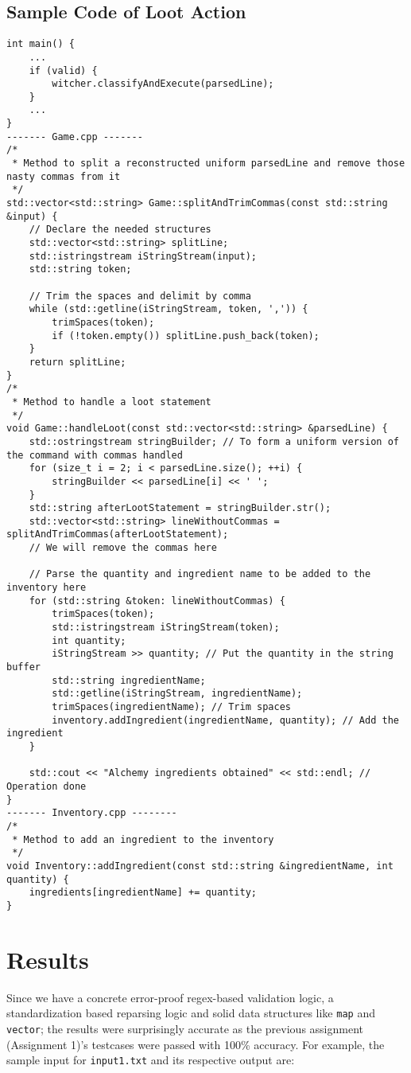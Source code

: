 \documentclass[a4paper,12pt]{article}
\begin{document}
\subsection{Sample Code of Loot Action}
\begin{lstlisting}[style=CStyle]
int main() {
    ...
    if (valid) {
        witcher.classifyAndExecute(parsedLine);
    }
    ...
}
------- Game.cpp -------
/*
 * Method to split a reconstructed uniform parsedLine and remove those nasty commas from it
 */
std::vector<std::string> Game::splitAndTrimCommas(const std::string &input) {
    // Declare the needed structures
    std::vector<std::string> splitLine;
    std::istringstream iStringStream(input);
    std::string token;

    // Trim the spaces and delimit by comma
    while (std::getline(iStringStream, token, ',')) {
        trimSpaces(token);
        if (!token.empty()) splitLine.push_back(token);
    }
    return splitLine;
}
/*
 * Method to handle a loot statement
 */
void Game::handleLoot(const std::vector<std::string> &parsedLine) {
    std::ostringstream stringBuilder; // To form a uniform version of the command with commas handled
    for (size_t i = 2; i < parsedLine.size(); ++i) {
        stringBuilder << parsedLine[i] << ' ';
    }
    std::string afterLootStatement = stringBuilder.str();
    std::vector<std::string> lineWithoutCommas = splitAndTrimCommas(afterLootStatement);
    // We will remove the commas here

    // Parse the quantity and ingredient name to be added to the inventory here
    for (std::string &token: lineWithoutCommas) {
        trimSpaces(token);
        std::istringstream iStringStream(token);
        int quantity;
        iStringStream >> quantity; // Put the quantity in the string buffer
        std::string ingredientName;
        std::getline(iStringStream, ingredientName);
        trimSpaces(ingredientName); // Trim spaces
        inventory.addIngredient(ingredientName, quantity); // Add the ingredient
    }

    std::cout << "Alchemy ingredients obtained" << std::endl; // Operation done
}
------- Inventory.cpp --------
/*
 * Method to add an ingredient to the inventory
 */
void Inventory::addIngredient(const std::string &ingredientName, int quantity) {
    ingredients[ingredientName] += quantity;
}

\end{lstlisting}

\section{Results}
Since we have a concrete error-proof regex-based validation logic, a standardization based reparsing logic and solid data structures like \texttt{map} and \texttt{vector}; the results were surprisingly accurate as the previous assignment (Assignment 1)'s testcases were passed with 100\% accuracy. For example, the sample input for \texttt{input1.txt} and its respective output are:
\end{document}

